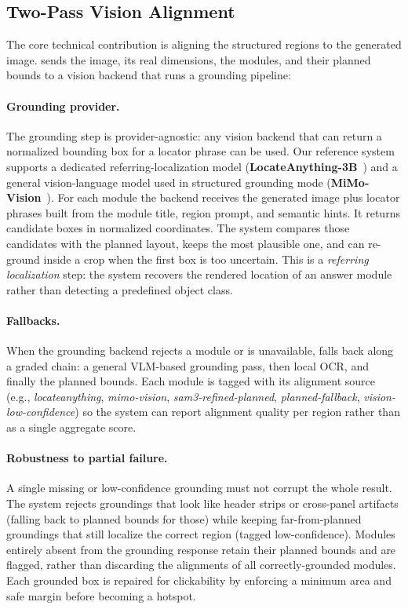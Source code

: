 \subsection{Two-Pass Vision Alignment}
\label{sec:method_alignment}

The core technical contribution is aligning the structured regions to the
generated image. \method{} sends the image, its real dimensions, the modules,
and their planned bounds to a vision backend that runs a grounding pipeline:

\paragraph{Grounding provider.}
The grounding step is provider-agnostic: any vision backend that can return a
normalized bounding box for a locator phrase can be used. Our reference system
supports a dedicated referring-localization model
(\textbf{LocateAnything-3B}~\citep{nvidia2025locateanything}) and a general
vision-language model used in structured grounding mode
(\textbf{MiMo-Vision}~\citep{xiaomi2025mimovl}). For each module the backend
receives the generated image plus locator phrases built from the module title,
region prompt, and semantic hints. It returns candidate boxes in normalized
coordinates. The system compares those candidates with the planned layout,
keeps the most plausible one, and can re-ground inside a crop when the first
box is too uncertain. This is a \emph{referring localization} step: the system
recovers the rendered location of an answer module rather than detecting a
predefined object class.

\paragraph{Fallbacks.}
When the grounding backend rejects a module or is unavailable, \method{}
falls back along a graded chain: a general VLM-based grounding pass, then
local OCR, and finally the planned bounds. Each module is tagged with its
alignment source (e.g., \textit{locateanything}, \textit{mimo-vision},
\textit{sam3-refined-planned}, \textit{planned-fallback},
\textit{vision-low-confidence}) so the system can report alignment quality
per region rather than as a single aggregate score.

\paragraph{Robustness to partial failure.}
A single missing or low-confidence grounding must not corrupt the whole
result. The system rejects groundings that look like header strips or cross-panel
artifacts (falling back to planned bounds for those) while keeping
far-from-planned groundings that still localize the correct region (tagged
low-confidence). Modules entirely absent from the grounding response retain
their planned bounds and are flagged, rather than discarding the alignments of
all correctly-grounded modules. Each grounded box is repaired for
clickability by enforcing a minimum area and safe margin before becoming a
hotspot.

